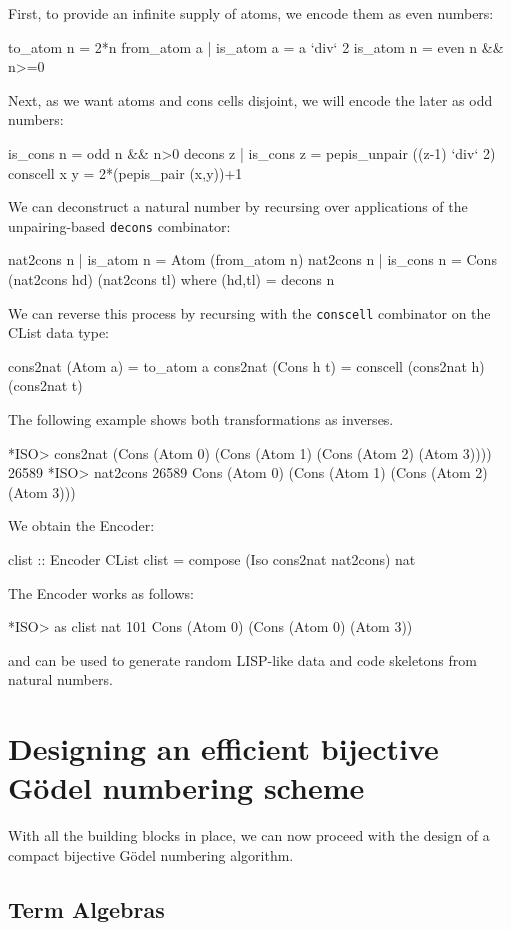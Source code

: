 \documentclass[]{INCLUDES/llncs}
\begin{document}
First, to provide an infinite supply of atoms, we encode them
as even numbers:
\begin{code}
to_atom n = 2*n
from_atom a | is_atom a = a `div` 2
is_atom n = even n  && n>=0
\end{code}
Next, as we want atoms and cons cells disjoint, we will encode the later as
odd numbers:
\begin{code}
is_cons n = odd n && n>0
decons z | is_cons z = pepis_unpair ((z-1) `div` 2)
conscell x y = 2*(pepis_pair (x,y))+1
\end{code}
We can deconstruct a natural number by recursing over
applications of the unpairing-based {\tt decons} combinator:
\begin{code}
nat2cons n | is_atom n = Atom (from_atom n)
nat2cons n | is_cons n = 
  Cons (nat2cons hd) 
       (nat2cons tl) where
    (hd,tl) = decons n     
\end{code}
We can reverse this process by recursing with the {\tt conscell} combinator
on the CList data type:
\begin{code}
cons2nat (Atom a) =  to_atom a
cons2nat (Cons h t) = conscell (cons2nat h) (cons2nat t)
\end{code}
The following example shows both transformations as inverses.
\begin{codex}
*ISO> cons2nat (Cons (Atom 0) (Cons (Atom 1) (Cons (Atom 2) (Atom 3))))
26589
*ISO> nat2cons 26589
Cons (Atom 0) (Cons (Atom 1) (Cons (Atom 2) (Atom 3)))
\end{codex}
We obtain the Encoder:
\begin{code}
clist :: Encoder CList
clist = compose (Iso cons2nat nat2cons) nat
\end{code}
The Encoder works as follows:
\begin{codex}
*ISO> as clist nat 101
Cons (Atom 0) (Cons (Atom 0) (Atom 3))
\end{codex}
and can be used to generate random LISP-like data and code skeletons
from natural numbers.


\section{Designing an efficient bijective G\"odel numbering scheme}
With all the building blocks in place, we can now proceed with the design of
a compact bijective G\"odel numbering algorithm.

\subsection{Term Algebras}
\end{document}
